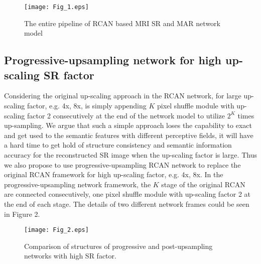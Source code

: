 \documentclass[runningheads]{llncs}
\begin{document}
\begin{figure}
\texttt{[image: Fig\_1.eps]}
\caption{The entire pipeline of RCAN based MRI SR and MAR network model} \label{Fig_1}
\end{figure}

\subsection{Progressive-upsampling network for high up-scaling SR factor}
Considering the original up-scaling approach in the RCAN network, for large up-scaling factor, e.g. 4x, 8x, is simply appending $K$ pixel shuffle module with up-scaling factor 2 consecutively at the end of the network model to utilize $2^K$ times up-sampling. We argue that such a simple approach loses the capability to exact and get used to the semantic features with different perceptive fields, it will have a hard time to get hold of structure consistency and semantic information accuracy for the reconstructed SR image when the up-scaling factor is large. Thus we also propose to use progressive-upsampling RCAN network to replace the original RCAN framework for high up-scaling factor, e.g. 4x, 8x. In the progressive-upsampling network framework, the $K$ stage of the original RCAN are connected consecutively, one pixel shuffle module with up-scaling factor 2 at the end of each stage. The details of two different network frames could be seen in Figure 2.

\begin{figure}
\texttt{[image: Fig\_2.eps]}
\caption{Comparison of structures of progressive and post-upsampling networks with high SR factor.} \label{Fig_2}
\end{figure}
\end{document}
